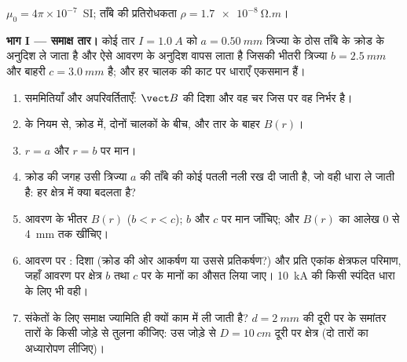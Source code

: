 \begin{problem}[{सप्ताहांत समस्या --- किसी समाक्ष तार पर ऐंपियर का नियम,
किसी विद्युत लाइन पर लाप्लास बल, और किसी चल-कुंडली धारामापी का
अभिकल्प}]
\label{pb:b1:magnetostatics:1}
$\mu_0 = 4\pi \times 10^{-7}$~SI; ताँबे की प्रतिरोधकता $\rho = \qty{1.7e-8}{\ohm.m}$।

\medskip
\noindent\textbf{भाग I --- समाक्ष तार।}
कोई तार $I = \qty{1.0}{A}$ को $a = \qty{0.50}{mm}$ त्रिज्या के ठोस ताँबे के
क्रोड के अनुदिश ले जाता है और ऐसे आवरण के अनुदिश वापस लाता है जिसकी भीतरी
त्रिज्या $b =
\qty{2.5}{mm}$ और बाहरी $c = \qty{3.0}{mm}$ है; और हर
चालक की काट पर धाराएँ एकसमान हैं।
\begin{enumerate}
  \item सममितियाँ और अपरिवर्तिताएँ: $\vect B$ की दिशा और वह चर जिस पर वह
        निर्भर है।
  \item {} के नियम से, क्रोड में, दोनों चालकों के बीच, और तार के बाहर
        $B(r)$।
  \item $r = a$ और $r = b$ पर मान।
  \item क्रोड की जगह उसी त्रिज्या $a$ की ताँबे की कोई पतली नली रख दी जाती
        है, जो वही धारा ले जाती है: हर क्षेत्र में क्या बदलता है?
  \item आवरण के भीतर $B(r)$ ($b < r < c$); $b$ और $c$ पर मान जाँचिए; और
        $B(r)$ का आलेख $0$ से \qty{4}{mm} तक खींचिए।
  \item आवरण पर : दिशा (क्रोड की ओर आकर्षण या उससे प्रतिकर्षण?)
        और प्रति एकांक क्षेत्रफल परिमाण, जहाँ आवरण पर क्षेत्र $b$ तथा
        $c$ पर के मानों का औसत लिया जाए।
        \qty{10}{kA} की किसी स्पंदित धारा के लिए भी वही।
  \item संकेतों के लिए समाक्ष ज्यामिति ही क्यों काम में ली जाती है? $d = \qty{2}{mm}$
        की दूरी पर के समांतर तारों के किसी जोड़े से तुलना कीजिए: उस जोड़े से
        $D = \qty{10}{cm}$ दूरी पर क्षेत्र (दो तारों का अध्यारोपण लीजिए)।
\end{enumerate}


\end{problem}
